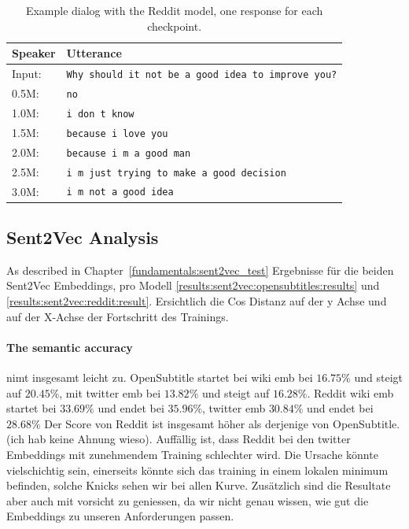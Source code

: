 \begin{table}[H]
	\centering
	\begin{adjustbox}{max width=\textwidth}
		\begin{tabular}{ll}
			\toprule
			Speaker & Utterance\\ \midrule
			Input: 	& \texttt{Why should it not be a good idea to improve you?}\\
			0.5M: 	& \texttt{no}\\
			1.0M: 	& \texttt{i don t know}\\
			1.5M:	& \texttt{because i love you}\\
			2.0M:	& \texttt{because i m a good man}\\
			2.5M:	& \texttt{i m just trying to make a good decision}\\
			3.0M:	& \texttt{i m not a good idea}\\
			\bottomrule
		\end{tabular}
	\end{adjustbox}
	\caption{Example dialog with the Reddit model, one response for each checkpoint.}
	\label{results:example_output2:OpenSubtitle}
\end{table}

\subsection{Sent2Vec Analysis}
As described in Chapter~\ref{fundamentals:sent2vec_test}
Ergebnisse für die beiden Sent2Vec Embeddings, pro Modell \ref{results:sent2vec:opensubtitles:results} und \ref{results:sent2vec:reddit:result}. Ersichtlich die Cos Distanz auf der y Achse und auf der X-Achse der Fortschritt des Trainings.

\paragraph{The semantic accuracy } nimt insgesamt leicht zu. OpenSubtitle startet bei wiki emb bei $16.75\%$ und steigt auf $20.45\%$, mit twitter emb bei $13.82\%$ und steigt auf $16.28\%$. Reddit wiki emb startet bei $33.69\%$ und endet bei $35.96\%$, twitter emb $30.84\%$ und endet bei $28.68\%$ Der Score von Reddit ist insgesamt höher als derjenige von OpenSubtitle. (ich hab keine Ahnung wieso). Auffällig ist, dass Reddit bei den twitter Embeddings mit zunehmendem Training schlechter wird. Die Ursache könnte vielschichtig sein, einerseits könnte sich das training in einem lokalen minimum befinden, solche Knicks sehen wir bei allen Kurve. Zusätzlich sind die Resultate aber auch mit vorsicht zu geniessen, da wir nicht genau wissen, wie gut die Embeddings zu unseren Anforderungen passen.

